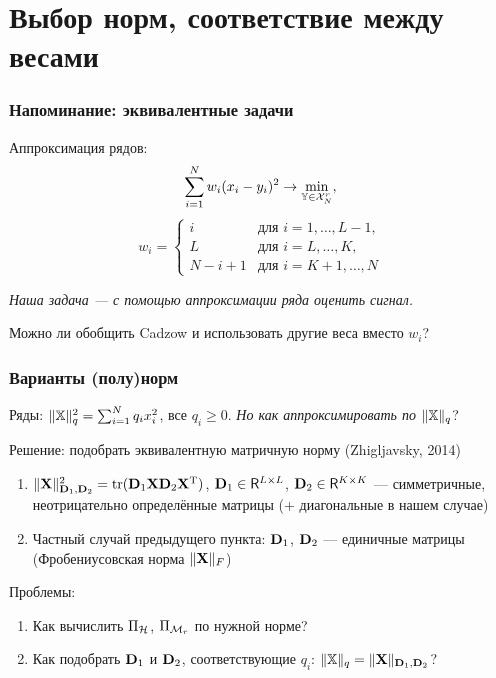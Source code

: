 \documentclass[unicode, notheorems]{beamer}
\begin{document}
\section{Выбор норм, соответствие между весами}
\begin{frame}
\frametitle{Напоминание: эквивалентные задачи}
Аппроксимация рядов:
\begin{equation*}
\sum \limits_{i=1}^N w_i(x_i - y_i)^2 \to \min_{\mathbb{Y} \in \mathcal{X}_N^r},
\end{equation*}
\begin{equation*}
w_i = \begin{cases}
i & \text{для $i = 1, \ldots, L-1,$}\\
L & \text{для $i = L, \ldots, K,$}\\
N - i + 1 & \text{для $i = K + 1, \ldots, N$}
\end{cases}
\end{equation*}

	\vspace{0.4cm}
\textit{Наша задача --- с помощью аппроксимации ряда оценить сигнал.}

	\vspace{0.4cm}
Можно ли обобщить Cadzow и использовать другие веса вместо $w_i$?
\end{frame}

\begin{frame}
	\frametitle{Варианты (полу)норм}
	Ряды:
	$\|\mathbb{X}\|_q^2 = \sum_{i = 1}^N q_i x_i^2$, все $q_i \ge 0$. \textit{Но как аппроксимировать по }$\|\mathbb{X}\|_q$?
	
	\vspace{0.4cm}
	Решение: подобрать эквивалентную матричную норму (Zhigljavsky, 2014)
	
	\begin{enumerate}
		\item $\|\mathbf{X}\|^2_{\mathbf{D}_1, \mathbf{D}_2} = \text{tr}(\mathbf{D}_1 \mathbf{X} \mathbf{D}_2 \mathbf{X}^{\mathrm{T}})$, $\mathbf{D}_1 \in \mathsf{R}^{L \times L}$, $\mathbf{D}_2 \in \mathsf{R}^{K \times K}$ --- симметричные, неотрицательно определённые матрицы (+ диагональные в нашем случае)
		\item Частный случай предыдущего пункта: $\mathbf{D}_1$, $\mathbf{D}_2$ --- единичные матрицы (Фробениусовская норма $\|\mathbf{X}\|_F$)

	\end{enumerate}
	
	\vspace{0.4cm}
	Проблемы:
	\begin{enumerate}
		\item Как вычислить $\Pi_{\mathcal{H}}$, $\Pi_{\mathcal{M}_r}$ по нужной норме?
		\item Как подобрать $\mathbf{D}_1$ и $\mathbf{D}_2$, соответствующие $q_i$: $\|\mathbb{X}\|_q = \|\mathbf{X}\|_{\mathbf{D}_1, \mathbf{D}_2}$?
	\end{enumerate}
\end{frame}
\end{document}
